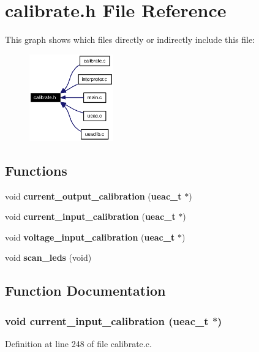 \section{calibrate.h File Reference}
\label{calibrate_8h}


This graph shows which files directly or indirectly include this file:\begin{figure}[H]
\begin{center}
\leavevmode
\includegraphics[width=103pt]{calibrate_8h__dep__incl}
\end{center}
\end{figure}
\subsection*{Functions}
\begin{CompactItemize}
\item 
void {\bf current\_\-output\_\-calibration} ({\bf ueac\_\-t} $\ast$)
\item 
void {\bf current\_\-input\_\-calibration} ({\bf ueac\_\-t} $\ast$)
\item 
void {\bf voltage\_\-input\_\-calibration} ({\bf ueac\_\-t} $\ast$)
\item 
void {\bf scan\_\-leds} (void)
\end{CompactItemize}


\subsection{Function Documentation}
\subsubsection{\setlength{\rightskip}{0pt plus 5cm}void current\_\-input\_\-calibration ({\bf ueac\_\-t} $\ast$)}\label{calibrate_8h_a1}




Definition at line 248 of file calibrate.c.

